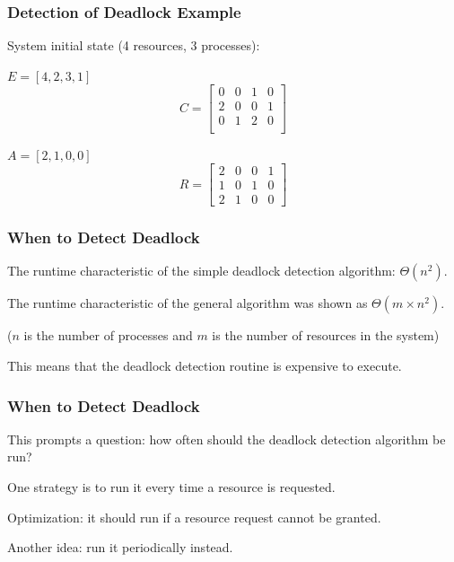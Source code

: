 \begin{frame}
	\frametitle{Detection of Deadlock Example}
	System initial state (4 resources, 3 processes):

	\begin{multicols}{2}
		\begin{center}
			$E = [4, 2, 3, 1]$
			\[ C =
				\left[ {\begin{array}{cccc}
								0 & 0 & 1 & 0 \\
								2 & 0 & 0 & 1 \\
								0 & 1 & 2 & 0 \\
							\end{array} } \right]
			\]
		\end{center}
		\columnbreak

		\begin{center}
			$A = [2, 1, 0, 0]$
			\[ R =
				\left[ {\begin{array}{cccc}
								2 & 0 & 0 & 1 \\
								1 & 0 & 1 & 0 \\
								2 & 1 & 0 & 0
							\end{array} } \right]
			\]
		\end{center}

	\end{multicols}


\end{frame}

\begin{frame}
	\frametitle{When to Detect Deadlock}

	The runtime characteristic of the simple deadlock detection algorithm: $\Theta(n^{2})$.

	The runtime characteristic of the general algorithm was shown as $\Theta(m \times n^{2})$.

	($n$ is the number of processes and $m$ is the number of resources in the system)

	This means that the deadlock detection routine is expensive to execute.


\end{frame}

\begin{frame}
	\frametitle{When to Detect Deadlock}

	This prompts a question: how often should the deadlock detection algorithm be run?

	One strategy is to run it every time a resource is requested.

	Optimization: it should run if a resource request cannot be granted.

	Another idea: run it periodically instead.

\end{frame}

